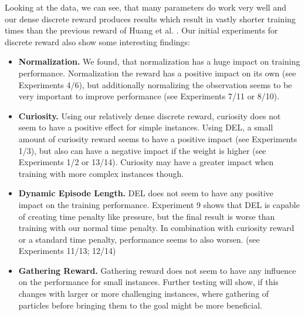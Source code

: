 Looking at the data, we can see, that many parameters do work very well and our dense discrete reward produces results which result in vastly shorter training times than the previous reward of Huang et al. \cite{huang2019}. Our initial experiments for discrete reward also show some interesting findings: 
\begin{itemize}
    \item \textbf{Normalization. } We found, that normalization has a huge impact on training performance. Normalization the reward has a positive impact on its own (see Experiments 4/6), but additionally normalizing the observation seems to be very important to improve performance (see Experiments 7/11 or 8/10).
    \item \textbf{Curiosity. } Using our relatively dense discrete reward, curiosity does not seem to have a positive effect for simple instances. Using DEL, a small amount of curiosity reward seems to have a positive impact (see Experiments 1/3), but also can have a negative impact if the weight is higher (see Experiments 1/2 or 13/14). Curiosity may have a greater impact when training with more complex instances though.
    \item \textbf{Dynamic Episode Length. } DEL does not seem to have any positive impact on the training performance. Experiment 9 shows that DEL is capable of creating time penalty like pressure, but the final result is worse than training with our normal time penalty. In combination with curiosity reward or a standard time penalty, performance seems to also worsen. (see Experiments 11/13; 12/14)
    \item \textbf{Gathering Reward. } Gathering reward does not seem to have any influence on the performance for small instances. Further testing will show, if this changes with larger or more challenging instances, where gathering of particles before bringing them to the goal might be more beneficial.
\end{itemize}


